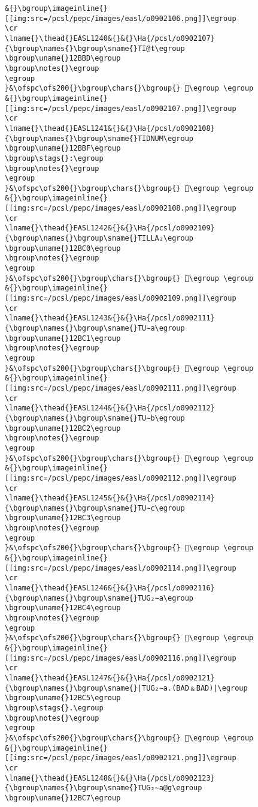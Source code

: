 \begin{verbatim}
&{}\bgroup\imageinline{}[[img:src=/pcsl/pepc/images/easl/o0902106.png]]\egroup
\cr
\lname{}\thead{}EASL1240&{}&{}\Ha{/pcsl/o0902107}{\bgroup\names{}\bgroup\sname{}TI@t\egroup
\bgroup\uname{}12BBD\egroup
\bgroup\notes{}\egroup
\egroup
}&\ofspc\ofs200{}\bgroup\chars{}\bgroup{} 𒮽\egroup \egroup
&{}\bgroup\imageinline{}[[img:src=/pcsl/pepc/images/easl/o0902107.png]]\egroup
\cr
\lname{}\thead{}EASL1241&{}&{}\Ha{/pcsl/o0902108}{\bgroup\names{}\bgroup\sname{}TIDNUM\egroup
\bgroup\uname{}12BBF\egroup
\bgroup\stags{}:\egroup
\bgroup\notes{}\egroup
\egroup
}&\ofspc\ofs200{}\bgroup\chars{}\bgroup{} 𒮿\egroup \egroup
&{}\bgroup\imageinline{}[[img:src=/pcsl/pepc/images/easl/o0902108.png]]\egroup
\cr
\lname{}\thead{}EASL1242&{}&{}\Ha{/pcsl/o0902109}{\bgroup\names{}\bgroup\sname{}TILLA₂\egroup
\bgroup\uname{}12BC0\egroup
\bgroup\notes{}\egroup
\egroup
}&\ofspc\ofs200{}\bgroup\chars{}\bgroup{} 𒯀\egroup \egroup
&{}\bgroup\imageinline{}[[img:src=/pcsl/pepc/images/easl/o0902109.png]]\egroup
\cr
\lname{}\thead{}EASL1243&{}&{}\Ha{/pcsl/o0902111}{\bgroup\names{}\bgroup\sname{}TU∼a\egroup
\bgroup\uname{}12BC1\egroup
\bgroup\notes{}\egroup
\egroup
}&\ofspc\ofs200{}\bgroup\chars{}\bgroup{} 𒯁\egroup \egroup
&{}\bgroup\imageinline{}[[img:src=/pcsl/pepc/images/easl/o0902111.png]]\egroup
\cr
\lname{}\thead{}EASL1244&{}&{}\Ha{/pcsl/o0902112}{\bgroup\names{}\bgroup\sname{}TU∼b\egroup
\bgroup\uname{}12BC2\egroup
\bgroup\notes{}\egroup
\egroup
}&\ofspc\ofs200{}\bgroup\chars{}\bgroup{} 𒯂\egroup \egroup
&{}\bgroup\imageinline{}[[img:src=/pcsl/pepc/images/easl/o0902112.png]]\egroup
\cr
\lname{}\thead{}EASL1245&{}&{}\Ha{/pcsl/o0902114}{\bgroup\names{}\bgroup\sname{}TU∼c\egroup
\bgroup\uname{}12BC3\egroup
\bgroup\notes{}\egroup
\egroup
}&\ofspc\ofs200{}\bgroup\chars{}\bgroup{} 𒯃\egroup \egroup
&{}\bgroup\imageinline{}[[img:src=/pcsl/pepc/images/easl/o0902114.png]]\egroup
\cr
\lname{}\thead{}EASL1246&{}&{}\Ha{/pcsl/o0902116}{\bgroup\names{}\bgroup\sname{}TUG₂∼a\egroup
\bgroup\uname{}12BC4\egroup
\bgroup\notes{}\egroup
\egroup
}&\ofspc\ofs200{}\bgroup\chars{}\bgroup{} 𒯄\egroup \egroup
&{}\bgroup\imageinline{}[[img:src=/pcsl/pepc/images/easl/o0902116.png]]\egroup
\cr
\lname{}\thead{}EASL1247&{}&{}\Ha{/pcsl/o0902121}{\bgroup\names{}\bgroup\sname{}|TUG₂∼a.(BAD﹠BAD)|\egroup
\bgroup\uname{}12BC5\egroup
\bgroup\stags{}.\egroup
\bgroup\notes{}\egroup
\egroup
}&\ofspc\ofs200{}\bgroup\chars{}\bgroup{} 𒯅\egroup \egroup
&{}\bgroup\imageinline{}[[img:src=/pcsl/pepc/images/easl/o0902121.png]]\egroup
\cr
\lname{}\thead{}EASL1248&{}&{}\Ha{/pcsl/o0902123}{\bgroup\names{}\bgroup\sname{}TUG₂∼a@g\egroup
\bgroup\uname{}12BC7\egroup

\end{verbatim}
